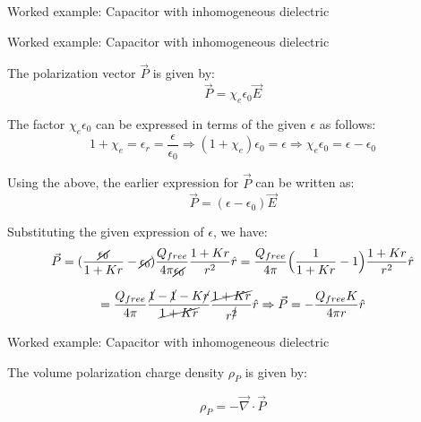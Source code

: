 {\begin{frame}{Worked example: Capacitor with inhomogeneous dielectric}
\end{frame}
%
%
%

\begin{frame}{Worked example: Capacitor with inhomogeneous dielectric}

  The polarization vector $\vec{P}$ is given by:
  \begin{equation*}
     \vec{P} = \chi_{e} \epsilon_0 \vec{E}
  \end{equation*}

  The factor $\chi_{e} \epsilon_0$ can be expressed in terms of
  the given $\epsilon$ as follows:
  \begin{equation*}
     1+\chi_{e} = \epsilon_{r} = \frac{\epsilon}{\epsilon_0} \Rightarrow
     (1+\chi_{e})\epsilon_0 = \epsilon \Rightarrow
     \chi_{e} \epsilon_0 = \epsilon - \epsilon_0
  \end{equation*}

  Using the above, the earlier expression for $\vec{P}$ can be written as:
  \begin{equation*}
     \vec{P} = (\epsilon - \epsilon_0) \vec{E}
  \end{equation*}

  Substituting the given expression of $\epsilon$, we have:
  \begin{equation*}
     \vec{P} =
        (\frac{\cancel{\epsilon_0}}{1+Kr} - \cancel{\epsilon_0})
        \frac{Q_{free}}{4\pi\cancel{\epsilon_0}} \frac{1+Kr}{r^2} \hat{r} =
        \frac{Q_{free}}{4\pi}
        \Big(\frac{1}{1+Kr} - 1\Big)
        \frac{1+Kr}{r^2} \hat{r}
  \end{equation*}

  \begin{equation*}
    = \frac{Q_{free}}{4\pi}
      \frac{\cancel{1}-\cancel{1}-K\cancel{r}}{\cancel{1+Kr}}
      \frac{\cancel{1+Kr}}{r^{\cancel{2}}} \hat{r} \Rightarrow
     \vec{P} = - \frac{Q_{free}K}{4\pi r} \hat{r}
  \end{equation*}

\end{frame}
%
%
%

\begin{frame}{Worked example: Capacitor with inhomogeneous dielectric}

  The volume polarization charge density $\rho_{P}$ is given by:

  \begin{equation*}
     \rho_{P} = - \vec{\nabla} \cdot \vec{P}
  \end{equation*}


\end{frame}}
